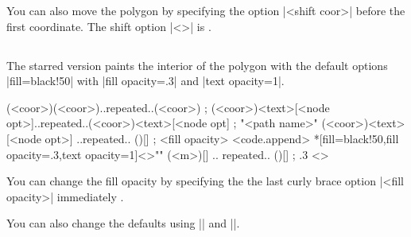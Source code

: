 You can also move the polygon by specifying the option |<shift coor>| before the first coordinate.
The  shift option |<>| is .

\begin{tzcode}{.3}
\end{tzcode}



\subsection{\protect\cmd{\tzpolygon*}}
\label{ss:tzpolygon*}

The starred version \icmd{\tzpolygon*} paints the interior of the polygon with the default options |fill=black!50| with |fill opacity=.3| and |text opacity=1|.

\begin{tzdef}
\tzpolygon*(<coor>)(<coor>)..repeated..(<coor>) ;
\tzpolygon*(<coor>){<text>}[<node opt>]..repeated..(<coor>){<text>}[<node opt] ;
"<path name>" 
           (<coor>){<text>}[<node opt>]
           ..repeated.. (){}[] ; {<fill opacity>} <code.append>
 *[fill=black!50,fill opacity=.3,text opacity=1]<>""
  (<m>){}[] .. repeated.. (){}[] ; {.3} <>
\end{tzdef}

You can change the fill opacity by specifying the the last curly brace option |{<fill opacity>}| immediately .

\begin{tzcode}{.3}
\end{tzcode}

You can also change the defaults using |\settzfillcolor| and |\settzfillopacity|.


